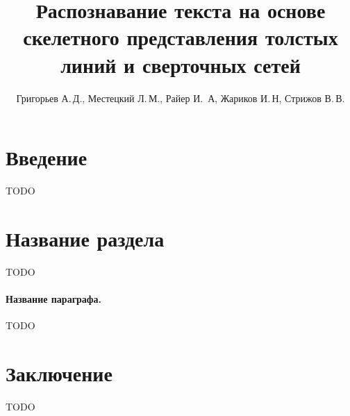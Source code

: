 \documentclass[12pt,twoside]{article}
\title
    [Распознавание текста на основе скелетного представления толстых линий и сверточных сетей] 
    {Распознавание текста на основе скелетного представления толстых линий и сверточных сетей}
\author
    [Григорьев А.\,Д., Местецкий Л.\,М., Райер И.\, А, Жариков И.\,Н, Стрижов В.\,В.] 
    {Григорьев А.\,Д., Местецкий Л.\,М., Райер И.\, А, Жариков И.\,Н, Стрижов В.\,В.}
    [Григорьев А.\,Д., Местецкий Л.\,М., Райер И.\, А, Жариков И.\,Н, Стрижов~В.\,В.]
\begin{document}
\maketitle
\section{Введение}
TODO

\section{Название раздела}
TODO

\paragraph{Название параграфа.}
TODO

\section{Заключение}
TODO






\end{document}
